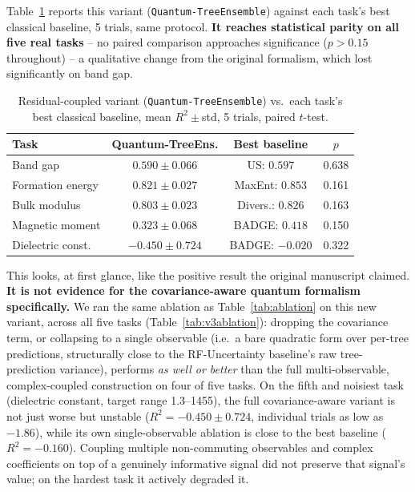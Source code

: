 \documentclass[conference]{IEEEtran}
\begin{document}
Table~\ref{tab:v3} reports this variant (\texttt{Quantum-TreeEnsemble}) against each task's best classical baseline, 5 trials, same protocol. \textbf{It reaches statistical parity on all five real tasks} -- no paired comparison approaches significance ($p>0.15$ throughout) -- a qualitative change from the original formalism, which lost significantly on band gap.

\begin{table}[!t]
\centering
\caption{Residual-coupled variant (\texttt{Quantum-TreeEnsemble}) vs.\ each task's best classical baseline, mean $R^2\pm$std, 5 trials, paired $t$-test.}
\label{tab:v3}
\begin{tabular}{lccc}
\toprule
Task & Quantum-TreeEns. & Best baseline & $p$ \\
\midrule
Band gap & $0.590\pm0.066$ & US: $0.597$ & 0.638 \\
Formation energy & $0.821\pm0.027$ & MaxEnt: $0.853$ & 0.161 \\
Bulk modulus & $0.803\pm0.023$ & Divers.: $0.826$ & 0.163 \\
Magnetic moment & $0.323\pm0.068$ & BADGE: $0.418$ & 0.150 \\
Dielectric const. & $-0.450\pm0.724$ & BADGE: $-0.020$ & 0.322 \\
\bottomrule
\end{tabular}
\end{table}

This looks, at first glance, like the positive result the original manuscript claimed. \textbf{It is not evidence for the covariance-aware quantum formalism specifically.} We ran the same ablation as Table~\ref{tab:ablation} on this new variant, across all five tasks (Table~\ref{tab:v3ablation}): dropping the covariance term, or collapsing to a single observable (i.e.\ a bare quadratic form over per-tree predictions, structurally close to the RF-Uncertainty baseline's raw tree-prediction variance), performs \emph{as well or better} than the full multi-observable, complex-coupled construction on four of five tasks. On the fifth and noisiest task (dielectric constant, target range 1.3--1455), the full covariance-aware variant is not just worse but unstable ($R^2=-0.450\pm0.724$, individual trials as low as $-1.86$), while its own single-observable ablation is close to the best baseline ($R^2=-0.160$). Coupling multiple non-commuting observables and complex coefficients on top of a genuinely informative signal did not preserve that signal's value; on the hardest task it actively degraded it.
\end{document}
